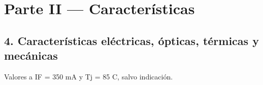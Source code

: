 \documentclass[11pt,a4paper]{article}
\begin{document}
\clearpage

\section*{Parte II — Características}


\subsection*{4. Características eléctricas, ópticas, térmicas y mecánicas}

Valores a IF = 350 mA y Tj = 85 \textdegree{}C, salvo indicación.

\begingroup\footnotesize
\setlength{\tabcolsep}{4pt}
\setlength{\emergencystretch}{4em}
 
\end{document}
